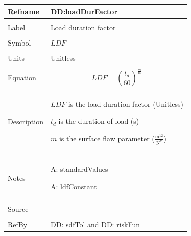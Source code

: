 \documentclass[12pt]{article}
\begin{document}
\noindent \begin{minipage}{\textwidth}
\begin{tabular}{>{\raggedright}p{}>{\raggedright\arraybackslash}p{}}
\toprule \textbf{Refname} & \textbf{DD:loadDurFactor}
\label{DD:loadDurFactor}
\\ \midrule \\
Label & Load duration factor
        
\\ \midrule \\
Symbol & $LDF$
         
\\ \midrule \\
Units & Unitless
        
\\ \midrule \\
Equation & \begin{displaymath}
           LDF=\left(\frac{{t_{d}}}{60}\right)^{\frac{m}{16}}
           \end{displaymath}
\\ \midrule \\
Description & \begin{symbDescription}
              \item{$LDF$ is the load duration factor (Unitless)}
              \item{${t_{d}}$ is the duration of load (s)}
              \item{$m$ is the surface flaw parameter ($\frac{\text{m}^{12}}{\text{N}^{7}}$)}
              \end{symbDescription}
\\ \midrule \\
Notes & \hyperref[assumpSV]{A: standardValues}
        
        \hyperref[assumpLDFC]{A: ldfConstant}
        
\\ \midrule \\
Source & \cite{astm2009}
         
\\ \midrule \\
RefBy & \hyperref[DD:sdfTol]{DD: sdfTol} and \hyperref[DD:riskFun]{DD: riskFun}
        
\\ \bottomrule
\end{tabular}
\end{minipage}
\end{document}
